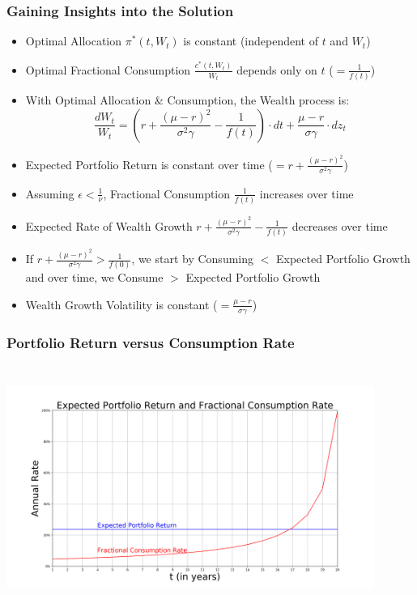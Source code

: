 \documentclass[handout]{beamer}
\begin{document}
\begin{frame}
\frametitle{Gaining Insights into the Solution}
\pause
\begin{itemize}[<+->]
\item Optimal Allocation $\pi^*(t, W_t)$ is constant (independent of $t$ and $W_t$)
\item Optimal Fractional Consumption $\frac {c^*(t, W_t)} {W_t}$ depends only on $t$ ($=\frac 1 {f(t)}$)
\item With Optimal Allocation \& Consumption, the Wealth process is:
$$\frac {dW_t} {W_t} = (r + \frac {(\mu - r)^2} {\sigma^2 \gamma} - \frac 1 {f(t)}) \cdot dt + \frac {\mu - r} {\sigma \gamma} \cdot dz_t$$
\item Expected Portfolio Return is constant over time ($=r + \frac {(\mu - r)^2} {\sigma^2 \gamma}$)
\item Assuming $\epsilon < \frac 1 {\nu}$, Fractional Consumption $\frac 1 {f(t)}$ increases over time
\item Expected Rate of Wealth Growth $r + \frac {(\mu - r)^2} {\sigma^2 \gamma} - \frac 1 {f(t)}$ decreases over time
\item If $r + \frac {(\mu - r)^2} {\sigma^2 \gamma} > \frac 1 {f(0)}$, we start by Consuming $<$ Expected Portfolio Growth and over time, we Consume $>$ Expected Portfolio Growth
\item Wealth Growth Volatility is constant ($= \frac {\mu - r} {\sigma \gamma}$)
\end{itemize}

\end{frame}

\begin{frame}
\frametitle{Portfolio Return versus Consumption Rate}
\includegraphics[width=12cm, height=8cm]{portfolio.png}
\end{frame}
\end{document}
